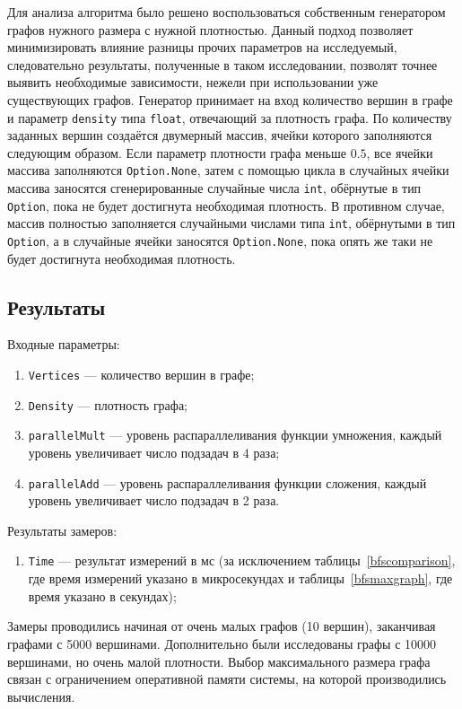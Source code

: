 Для анализа алгоритма было решено воспользоваться собственным генератором графов нужного размера с нужной плотностью. Данный подход позволяет минимизировать влияние разницы прочих параметров на исследуемый, следовательно результаты, полученные в таком исследовании, позволят точнее выявить необходимые зависимости, нежели при использовании уже существующих графов. Генератор принимает на вход количество вершин в графе и параметр \texttt{density} типа \texttt{float}, отвечающий за плотность графа. По количеству заданных вершин создаётся двумерный массив, ячейки которого заполняются следующим образом. Если параметр плотности графа меньше $0.5$, все ячейки массива заполняются \texttt{Option.None}, затем с помощью цикла в случайных ячейки массива заносятся сгенерированные случайные числа \texttt{int}, обёрнутые в тип \texttt{Option}, пока не будет достигнута необходимая плотность. В противном случае, массив полностью заполняется случайными числами типа \texttt{int}, обёрнутыми в тип \texttt{Option}, а в случайные ячейки заносятся \texttt{Option.None}, пока опять же таки не будет достигнута необходимая плотность. 

\subsection{Результаты}

Входные параметры:
 \begin{enumerate}
 \item  \texttt{Vertices} --- количество вершин в графе; 
 \item  \texttt{Density} --- плотность графа;
 \item \texttt{parallelMult} --- уровень распараллеливания функции умножения, каждый уровень увеличивает число подзадач в 4 раза;
  \item \texttt{parallelAdd} --- уровень распараллеливания функции сложения, каждый уровень увеличивает число подзадач в 2 раза.
\end{enumerate}

Результаты замеров:
\begin{enumerate}
\item  \texttt{Time} --- результат измерений в мс (за исключением таблицы~\ref{bfscomparison}, где время измерений указано в микросекундах и таблицы~\ref{bfsmaxgraph}, где время указано в секундах);
\end{enumerate}

Замеры проводились начиная от очень малых графов (10 вершин), заканчивая графами с 5000 вершинами. Дополнительно были исследованы графы с 10000 вершинами, но очень малой плотности. Выбор максимального размера графа связан с ограничением оперативной памяти системы, на которой производились вычисления.

